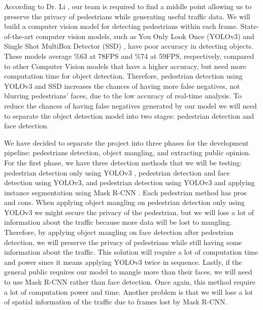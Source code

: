 \documentclass[onecolumn, draftclsnofoot,10pt, compsoc]{IEEEtran}
\begin{document}
According to Dr. Li \cite{li}, our team is required to find a middle point allowing us to preserve the privacy of pedestrians while generating useful traffic data. We will build a computer vision model for detecting pedestrians within each frame. State-of-the-art computer vision models, such as You Only Look Once (YOLOv3) \cite{YOLOv3} and Single Shot MultiBox Detector (SSD) \cite{SSD}, have poor accuracy in detecting objects. These models average \%63 at 78FPS and \%74 at 59FPS, respectively, compared to other Computer Vision models that have a higher accuracy, but need more computation time for object detection. Therefore, pedestrian detection using YOLOv3 and SSD increases the chances of having more false negatives, not blurring pedestrians' faces, due to the low accuracy of real-time analysis. To reduce the chances of having false negatives generated by our model we will need to separate the object detection model into two stages: pedestrian detection and face detection.

We have decided to separate the project into three phases for the development pipeline: pedestrians detection, object mangling, and extracting public opinion. For the first phase, we have three detection methods that we will be testing: pedestrian detection only using YOLOv3 \cite{YOLOv3}, pedestrian detection and face detection using YOLOv3, and pedestrian detection using YOLOv3 and applying instance segmentation using Mask R-CNN \cite{mask-r-cnn}. Each pedestrian method has pros and cons. When applying object mangling on pedestrian detection only using YOLOv3 we might secure the privacy of the pedestrian, but we will lose a lot of information about the traffic because more data will be lost to mangling. Therefore, by applying object mangling on face detection after pedestrian detection, we will preserve the privacy of pedestrians while still having some information about the traffic. This solution will require a lot of computation time and power since it means applying YOLOv3 twice in sequence. Lastly, if the general public requires our model to mangle more than their faces, we will need to use Mask R-CNN rather than face detection. Once again, this method require a lot of computation power and time. Another problem is that we will lose a lot of spatial information of the traffic due to frames lost by Mask R-CNN.
\end{document}
